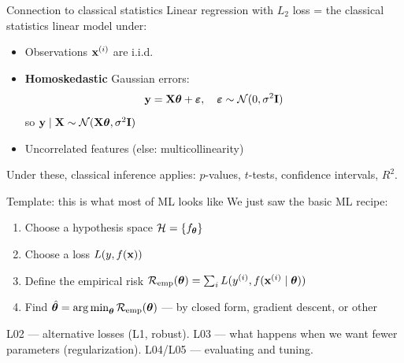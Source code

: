 \documentclass[aspectratio=169]{beamer}
\begin{document}
\begin{frame}{Connection to classical statistics}
  Linear regression with $L_2$ loss = the classical statistics linear model under:
  \begin{itemize}
    \item Observations $\mathbf{x}^{(i)}$ are i.i.d.
    \item \textbf{Homoskedastic} Gaussian errors:
      \[
        \mathbf{y} = \mathbf{X} \bm{\theta} + \bm{\varepsilon},
        \quad \bm{\varepsilon} \sim \mathcal{N}(0, \sigma^2 \mathbf{I})
      \]
      so $\mathbf{y} \mid \mathbf{X} \sim \mathcal{N}(\mathbf{X} \bm{\theta}, \sigma^2 \mathbf{I})$
    \item Uncorrelated features (else: multicollinearity)
  \end{itemize}
  \vfill
  Under these, classical inference applies: $p$-values, $t$-tests, confidence intervals, $R^2$.
\end{frame}

\begin{frame}{Template: this is what most of ML looks like}
  We just saw the basic ML recipe:
  \begin{enumerate}
    \item Choose a hypothesis space $\mathcal{H} = \{f_{\bm{\theta}}\}$
    \item Choose a loss $L(y, f(\mathbf{x}))$
    \item Define the empirical risk $\mathcal{R}_{\text{emp}}(\bm{\theta}) = \sum_i L(y^{(i)}, f(\mathbf{x}^{(i)} \mid \bm{\theta}))$
    \item Find $\hat{\bm{\theta}} = \mathop{\mathrm{arg\,min}}_{\bm{\theta}} \mathcal{R}_{\text{emp}}(\bm{\theta})$ — by closed form, gradient descent, or other
  \end{enumerate}
  \vfill
  L02 — alternative losses (L1, robust). L03 — what happens when we want fewer parameters (regularization). L04/L05 — evaluating and tuning.
\end{frame}
\end{document}
